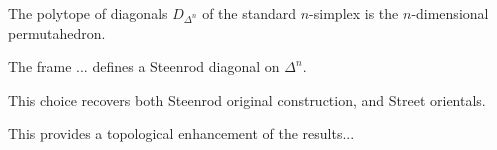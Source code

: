 \begin{lemma}
	The polytope of diagonals $D_{\Delta^n}$ of the standard $n$-simplex is the $n$-dimensional permutahedron. 
\end{lemma}

\begin{lemma}
	The frame ... defines a Steenrod diagonal on $\Delta^n$. 
\end{lemma}

\begin{theorem}
	This choice recovers both Steenrod original construction, and Street orientals. 
\end{theorem}

This provides a topological enhancement of the results...




